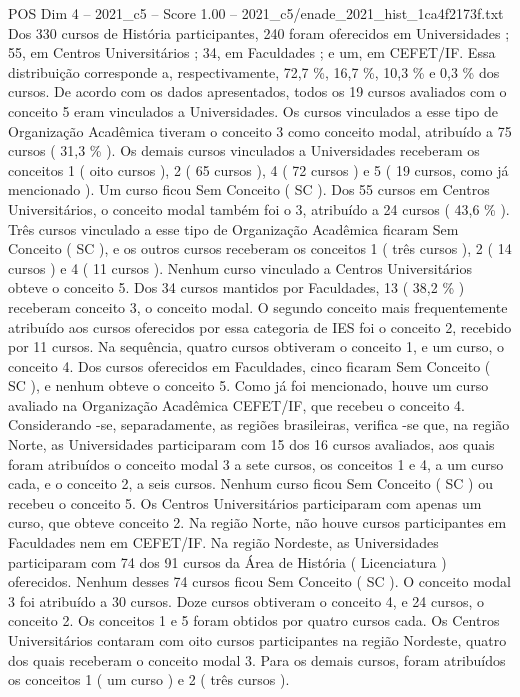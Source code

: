 \begin{textsample}{POS Dim 4 – 2021\_c5 – Score 1.00 – 2021\_c5/enade\_2021\_hist\_1ca4f2173f.txt}
Dos 330 cursos de História participantes, 240 foram oferecidos em Universidades ; 55, em Centros Universitários ; 34, em Faculdades ; e um, em CEFET/IF.
Essa distribuição corresponde a, respectivamente, 72,7 \%, 16,7 \%, 10,3 \% e 0,3 \% dos cursos.
De acordo com os dados apresentados, todos os 19 cursos avaliados com o conceito 5 eram vinculados a Universidades.
Os cursos vinculados a esse tipo de Organização Acadêmica tiveram o conceito 3 como conceito modal, atribuído a 75 cursos ( 31,3 \% ).
Os demais cursos vinculados a Universidades receberam os conceitos 1 ( oito cursos ), 2 ( 65 cursos ), 4 ( 72 cursos ) e 5 ( 19 cursos, como já mencionado ).
Um curso ficou Sem Conceito ( SC ).
Dos 55 cursos em Centros Universitários, o conceito modal também foi o 3, atribuído a 24 cursos ( 43,6 \% ).
Três cursos vinculado a esse tipo de Organização Acadêmica ficaram Sem Conceito ( SC ), e os outros cursos receberam os conceitos 1 ( três cursos ), 2 ( 14 cursos ) e 4 ( 11 cursos ).
Nenhum curso vinculado a Centros Universitários obteve o conceito 5.
Dos 34 cursos mantidos por Faculdades, 13 ( 38,2 \% ) receberam conceito 3, o conceito modal.
O segundo conceito mais frequentemente atribuído aos cursos oferecidos por essa categoria de IES foi o conceito 2, recebido por 11 cursos.
Na sequência, quatro cursos obtiveram o conceito 1, e um curso, o conceito 4.
Dos cursos oferecidos em Faculdades, cinco ficaram Sem Conceito ( SC ), e nenhum obteve o conceito 5.
Como já foi mencionado, houve um curso avaliado na Organização Acadêmica CEFET/IF, que recebeu o conceito 4.
Considerando -se, separadamente, as regiões brasileiras, verifica -se que, na região Norte, as Universidades participaram com 15 dos 16 cursos avaliados, aos quais foram atribuídos o conceito modal 3 a sete cursos, os conceitos 1 e 4, a um curso cada, e o conceito 2, a seis cursos.
Nenhum curso ficou Sem Conceito ( SC ) ou recebeu o conceito 5.
Os Centros Universitários participaram com apenas um curso, que obteve conceito 2.
Na região Norte, não houve cursos participantes em Faculdades nem em CEFET/IF.
Na região Nordeste, as Universidades participaram com 74 dos 91 cursos da Área de História ( Licenciatura ) oferecidos.
Nenhum desses 74 cursos ficou Sem Conceito ( SC ).
O conceito modal 3 foi atribuído a 30 cursos.
Doze cursos obtiveram o conceito 4, e 24 cursos, o conceito 2.
Os conceitos 1 e 5 foram obtidos por quatro cursos cada.
Os Centros Universitários contaram com oito cursos participantes na região Nordeste, quatro dos quais receberam o conceito modal 3.
Para os demais cursos, foram atribuídos os conceitos 1 ( um curso ) e 2 ( três cursos ).

\end{textsample}
